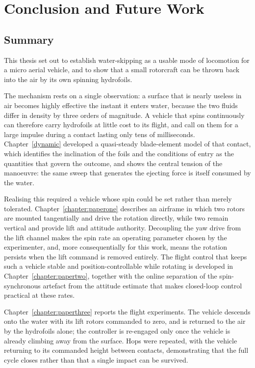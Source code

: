 \chapter{Conclusion and Future Work}
\label{chapter:conclusion}

\section{Summary}

This thesis set out to establish water-skipping as a usable mode of
locomotion for a micro aerial vehicle, and to show that a small rotorcraft can
be thrown back into the air by its own spinning hydrofoils.

The mechanism rests on a single observation: a surface that is nearly useless
in air becomes highly effective the instant it enters water, because the two
fluids differ in density by three orders of magnitude.  A vehicle that spins
continuously can therefore carry hydrofoils at little cost to its flight, and
call on them for a large impulse during a contact lasting only tens of
milliseconds.  Chapter~\ref{dynamic} developed a quasi-steady blade-element
model of that contact, which identifies the inclination of the foils and the
conditions of entry as the quantities that govern the outcome, and shows the
central tension of the manoeuvre: the same sweep that generates the ejecting
force is itself consumed by the water.

Realising this required a vehicle whose spin could be set rather than merely
tolerated.  Chapter~\ref{chapter:paperone} describes an airframe in which two
rotors are mounted tangentially and drive the rotation directly, while two
remain vertical and provide lift and attitude authority.  Decoupling the yaw
drive from the lift channel makes the spin rate an operating parameter chosen
by the experimenter, and, more consequentially for this work, means the
rotation persists when the lift command is removed entirely.  The flight
control that keeps such a vehicle stable and position-controllable while
rotating is developed in Chapter~\ref{chapter:papertwo}, together with the
online separation of the spin-synchronous artefact from the attitude estimate
that makes closed-loop control practical at these rates.

Chapter~\ref{chapter:paperthree} reports the flight experiments.  The vehicle
descends onto the water with its lift rotors commanded to zero, and is
returned to the air by the hydrofoils alone; the controller is re-engaged only
once the vehicle is already climbing away from the surface.  Hops were
repeated, with the vehicle returning to its commanded height between contacts,
demonstrating that the full cycle closes rather than that a single impact can
be survived.

